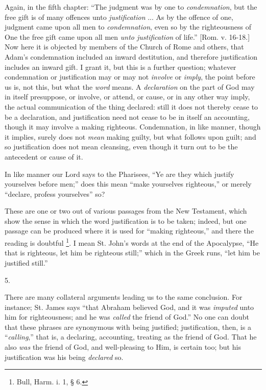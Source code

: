 Again, in the fifth chapter: ``The judgment was by one to \emph{condemnation},
but the free gift is of many offences unto \emph{justification} ... As
by the offence of one, judgment came upon all men to \emph{condemnation},
even so by the righteousness of One the free gift came upon all men \emph{unto
justification} of life.'' [Rom. v. 16-18.] Now here it is
objected by members of the Church of Rome and others, that Adam's
condemnation included an inward destitution, and therefore
justification includes an inward gift. I grant it, but this is a
further question; whatever condemnation or justification may or may
not \emph{involve} or \emph{imply}, the point before us is, not this,
but what the \emph{word} means. A \emph{declaration} on the part of
God may in itself presuppose, or involve, or attend, or cause, or in
any other way imply, the actual communication of the thing declared:
still it does not thereby cease to be a declaration, and justification
need not cease to be in itself an accounting, though it may involve a
making righteous. Condemnation, in like manner, though it implies,
surely does not \emph{mean} making guilty, but what follows upon
guilt; and so justification does not mean cleansing, even though
it turn out to be the antecedent or cause of it.

In like manner our Lord says to the Pharisees, ``Ye are they
which justify yourselves before men;'' does this mean ``make
yourselves righteous,'' or merely ``declare, profess
yourselves'' so?

These are one or two out of various passages from the New
Testament, which show the sense in which the word justification is to
be taken; indeed, but one passage can be produced where it is used for
``making righteous,'' and there the reading is doubtful \footnote{Bull, Harm. i. 1, § 6.}. I mean St. John's words at the end of the Apocalypse, ``He
that is righteous, let him be righteous still;'' which in the
Greek runs, ``let him be justified still.''

5.

There are many collateral arguments leading us to the same
conclusion. For instance; St. James says ``that Abraham believed
God, and it was \emph{imputed} unto him for righteousness; and he was \emph{called}
the friend of God.'' No one can doubt that these phrases are
synonymous with being justified; justification, then, is a ``\emph{calling},''
that is, a declaring, accounting, treating as the friend of God. That
he also \emph{was} the friend of God, and well-pleasing to Him, is
certain too; but his justification was his being \emph{declared} so.

